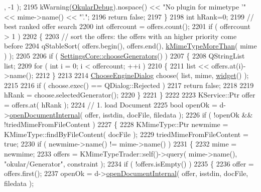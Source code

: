 \begin{DoxyCode}
      , -1 );
2195         kWarning(\hyperlink{debug__p_8h_af16c6e32a95969dd0605d792ec9807c7}{OkularDebug}).nospace() << \textcolor{stringliteral}{"No plugin for mimetype '"} << mime->name() << \textcolor{stringliteral}{"'."};
2196         \textcolor{keywordflow}{return} \textcolor{keyword}{false};
2197     \}
2198     \textcolor{keywordtype}{int} hRank=0;
2199     \textcolor{comment}{// best ranked offer search}
2200     \textcolor{keywordtype}{int} offercount = offers.count();
2201     \textcolor{keywordflow}{if} ( offercount > 1 )
2202     \{
2203         \textcolor{comment}{// sort the offers: the offers with an higher priority come before}
2204         qStableSort( offers.begin(), offers.end(), \hyperlink{classkMimeTypeMoreThan}{kMimeTypeMoreThan}( mime ) );
2205 
2206         \textcolor{keywordflow}{if} ( \hyperlink{classOkular_1_1SettingsCore_acceeadb86e54c1c6b6141ff06c3165f1}{SettingsCore::chooseGenerators}() )
2207         \{
2208             QStringList list;
2209             \textcolor{keywordflow}{for} ( \textcolor{keywordtype}{int} i = 0; i < offercount; ++i )
2210             \{
2211                 list << offers.at(i)->name();
2212             \}
2213 
2214             \hyperlink{classChooseEngineDialog}{ChooseEngineDialog} choose( list, mime, \hyperlink{classOkular_1_1Document_aef26598eca4c2fe772cc77d7730a9e8b}{widget}() );
2215 
2216             \textcolor{keywordflow}{if} ( choose.exec() == QDialog::Rejected )
2217                 \textcolor{keywordflow}{return} \textcolor{keyword}{false};
2218 
2219             hRank = choose.selectedGenerator();
2220         \}
2221     \}
2222 
2223     KService::Ptr offer = offers.at( hRank );
2224     \textcolor{comment}{// 1. load Document}
2225     \textcolor{keywordtype}{bool} openOk = d->\hyperlink{classOkular_1_1DocumentPrivate_a446649f974127476851f6a1d55e49d4d}{openDocumentInternal}( offer, isstdin, docFile, filedata );
2226     \textcolor{keywordflow}{if} ( !openOk && !triedMimeFromFileContent )
2227     \{
2228         KMimeType::Ptr newmime = KMimeType::findByFileContent( docFile );
2229         triedMimeFromFileContent = \textcolor{keyword}{true};
2230         \textcolor{keywordflow}{if} ( newmime->name() != mime->name() )
2231         \{
2232             mime = newmime;
2233             offers = KMimeTypeTrader::self()->query( mime->name(), \textcolor{stringliteral}{"okular/Generator"}, constraint );
2234             \textcolor{keywordflow}{if} ( !offers.isEmpty() )
2235             \{
2236                 offer = offers.first();
2237                 openOk = d->\hyperlink{classOkular_1_1DocumentPrivate_a446649f974127476851f6a1d55e49d4d}{openDocumentInternal}( offer, isstdin, docFile, filedata );

\end{DoxyCode}
